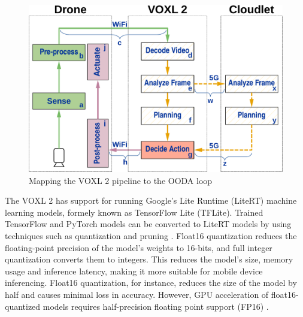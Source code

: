 \begin{figure}[htbp]
\centering
\includegraphics[width = .7\textwidth]{figs/fig-voxl-ooda-loop-crop.pdf}

\caption{Mapping the VOXL 2 pipeline to the OODA loop}
\label{fig:voxl2-ooda-loop-mapping}
\end{figure}

The VOXL 2 has support for running Google's Lite Runtime (LiteRT) machine
learning models, formely known as TensorFlow Lite (TFLite). Trained TensorFlow
and PyTorch models can be converted to LiteRT models by using techniques such
as quantization and pruning \cite{jacob2017}. Float16 quantization reduces the
floating-point precision of the model's weights to 16-bits, and full integer
quantization converts them to integers. This reduces the model's size, memory
usage and inference latency, making it more suitable for mobile device
inferencing. Float16 quantization, for instance, reduces the size of the model
by half and causes minimal loss in accuracy. However, GPU acceleration of
float16-quantized models requires half-precision floating point support (FP16)
\cite{ho2017}.

